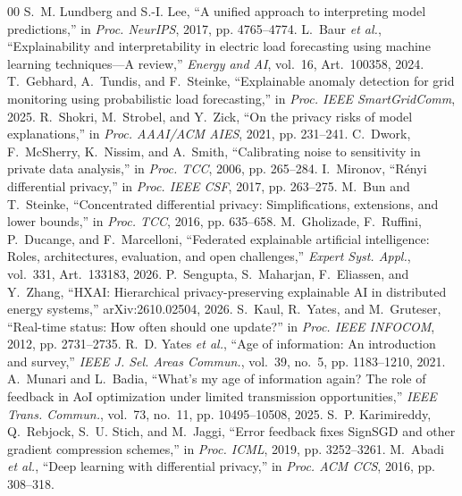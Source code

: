 \documentclass[conference]{IEEEtran}
\begin{document}
\begin{thebibliography}{00}\footnotesize
{} S.~M. Lundberg and S.-I. Lee, ``A unified approach to interpreting model predictions,'' in \emph{Proc. NeurIPS}, 2017, pp. 4765--4774.
 L.~Baur \emph{et al.}, ``Explainability and interpretability in electric load forecasting using machine learning techniques---A review,'' \emph{Energy and AI}, vol.~16, Art.~100358, 2024.
 T.~Gebhard, A.~Tundis, and F.~Steinke, ``Explainable anomaly detection for grid monitoring using probabilistic load forecasting,'' in \emph{Proc. IEEE SmartGridComm}, 2025.
 R.~Shokri, M.~Strobel, and Y.~Zick, ``On the privacy risks of model explanations,'' in \emph{Proc. AAAI/ACM AIES}, 2021, pp. 231--241.
 C.~Dwork, F.~McSherry, K.~Nissim, and A.~Smith, ``Calibrating noise to sensitivity in private data analysis,'' in \emph{Proc. TCC}, 2006, pp. 265--284.
 I.~Mironov, ``R\'enyi differential privacy,'' in \emph{Proc. IEEE CSF}, 2017, pp. 263--275.
 M.~Bun and T.~Steinke, ``Concentrated differential privacy: Simplifications, extensions, and lower bounds,'' in \emph{Proc. TCC}, 2016, pp. 635--658.
 M.~Gholizade, F.~Ruffini, P.~Ducange, and F.~Marcelloni, ``Federated explainable artificial intelligence: Roles, architectures, evaluation, and open challenges,'' \emph{Expert Syst. Appl.}, vol.~331, Art.~133183, 2026.
 P.~Sengupta, S.~Maharjan, F.~Eliassen, and Y.~Zhang, ``HXAI: Hierarchical privacy-preserving explainable AI in distributed energy systems,'' arXiv:2610.02504, 2026.
 S.~Kaul, R.~Yates, and M.~Gruteser, ``Real-time status: How often should one update?'' in \emph{Proc. IEEE INFOCOM}, 2012, pp. 2731--2735.
 R.~D. Yates \emph{et al.}, ``Age of information: An introduction and survey,'' \emph{IEEE J. Sel. Areas Commun.}, vol.~39, no.~5, pp. 1183--1210, 2021.
 A.~Munari and L.~Badia, ``What's my age of information again? The role of feedback in AoI optimization under limited transmission opportunities,'' \emph{IEEE Trans. Commun.}, vol.~73, no.~11, pp. 10495--10508, 2025.
 S.~P. Karimireddy, Q.~Rebjock, S.~U. Stich, and M.~Jaggi, ``Error feedback fixes SignSGD and other gradient compression schemes,'' in \emph{Proc. ICML}, 2019, pp. 3252--3261.
 M.~Abadi \emph{et al.}, ``Deep learning with differential privacy,'' in \emph{Proc. ACM CCS}, 2016, pp. 308--318.

\end{thebibliography}
\end{document}
